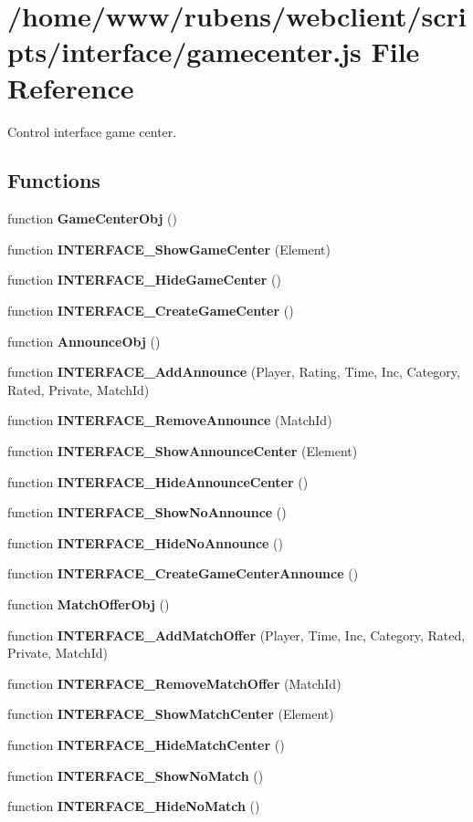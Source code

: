 \section{/home/www/rubens/webclient/scripts/interface/gamecenter.js File Reference}
\label{interface_2gamecenter_8js}
Control interface game center. 

\subsection*{Functions}
\begin{CompactItemize}
\item 
function {\bf GameCenterObj} ()
\item 
function {\bf INTERFACE\_\-ShowGameCenter} (Element)
\item 
function {\bf INTERFACE\_\-HideGameCenter} ()
\item 
function {\bf INTERFACE\_\-CreateGameCenter} ()
\item 
function {\bf AnnounceObj} ()
\item 
function {\bf INTERFACE\_\-AddAnnounce} (Player, Rating, Time, Inc, Category, Rated, Private, MatchId)
\item 
function {\bf INTERFACE\_\-RemoveAnnounce} (MatchId)
\item 
function {\bf INTERFACE\_\-ShowAnnounceCenter} (Element)
\item 
function {\bf INTERFACE\_\-HideAnnounceCenter} ()
\item 
function {\bf INTERFACE\_\-ShowNoAnnounce} ()
\item 
function {\bf INTERFACE\_\-HideNoAnnounce} ()
\item 
function {\bf INTERFACE\_\-CreateGameCenterAnnounce} ()
\item 
function {\bf MatchOfferObj} ()
\item 
function {\bf INTERFACE\_\-AddMatchOffer} (Player, Time, Inc, Category, Rated, Private, MatchId)
\item 
function {\bf INTERFACE\_\-RemoveMatchOffer} (MatchId)
\item 
function {\bf INTERFACE\_\-ShowMatchCenter} (Element)
\item 
function {\bf INTERFACE\_\-HideMatchCenter} ()
\item 
function {\bf INTERFACE\_\-ShowNoMatch} ()
\item 
function {\bf INTERFACE\_\-HideNoMatch} ()

\end{CompactItemize}
